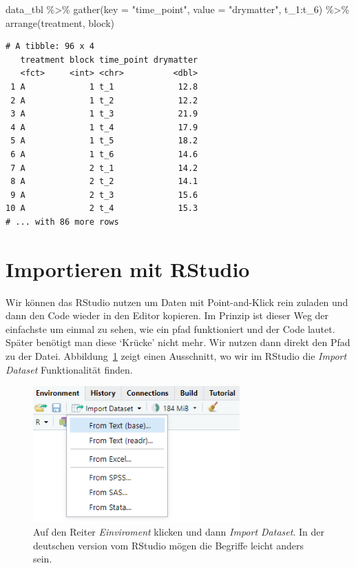 \documentclass[
  letterpaper,
  DIV=11,
  oneside]{scrreport}
\newenvironment{Shaded}{\begin{snugshade}}{\end{snugshade}}
\newcommand{\AttributeTok}[1]{\textcolor[rgb]{0.40,0.45,0.13}{#1}}
\newcommand{\FunctionTok}[1]{\textcolor[rgb]{0.28,0.35,0.67}{#1}}
\newcommand{\NormalTok}[1]{\textcolor[rgb]{0.00,0.23,0.31}{#1}}
\newcommand{\SpecialCharTok}[1]{\textcolor[rgb]{0.37,0.37,0.37}{#1}}
\newcommand{\StringTok}[1]{\textcolor[rgb]{0.13,0.47,0.30}{#1}}
\begin{document}
\begin{Shaded}
\begin{Highlighting}[]
\NormalTok{data\_tbl }\SpecialCharTok{\%\textgreater{}\%} 
  \FunctionTok{gather}\NormalTok{(}\AttributeTok{key =} \StringTok{"time\_point"}\NormalTok{, }\AttributeTok{value =} \StringTok{"drymatter"}\NormalTok{, t\_1}\SpecialCharTok{:}\NormalTok{t\_6) }\SpecialCharTok{\%\textgreater{}\%} 
  \FunctionTok{arrange}\NormalTok{(treatment, block)}
\end{Highlighting}
\end{Shaded}

\begin{verbatim}
# A tibble: 96 x 4
   treatment block time_point drymatter
   <fct>     <int> <chr>          <dbl>
 1 A             1 t_1             12.8
 2 A             1 t_2             12.2
 3 A             1 t_3             21.9
 4 A             1 t_4             17.9
 5 A             1 t_5             18.2
 6 A             1 t_6             14.6
 7 A             2 t_1             14.2
 8 A             2 t_2             14.1
 9 A             2 t_3             15.6
10 A             2 t_4             15.3
# ... with 86 more rows
\end{verbatim}

\hypertarget{importieren-mit-rstudio}{%
\section{Importieren mit RStudio}\label{importieren-mit-rstudio}}

Wir können das RStudio nutzen um Daten mit Point-and-Klick rein zuladen
und dann den Code wieder in den Editor kopieren. Im Prinzip ist dieser
Weg der einfachste um einmal zu sehen, wie ein pfad funktioniert und der
Code lautet. Später benötigt man diese `Krücke' nicht mehr. Wir nutzen
dann direkt den Pfad zu der Datei. Abbildung~\ref{fig-imp-01} zeigt
einen Ausschnitt, wo wir im RStudio die \emph{Import Dataset}
Funktionalität finden.

\begin{figure}

{\centering \includegraphics[width=3.125in,height=\textheight]{./images/import_01.PNG}

}

\caption{\label{fig-imp-01}Auf den Reiter \emph{Einviroment} klicken und
dann \emph{Import Dataset}. In der deutschen version vom RStudio mögen
die Begriffe leicht anders sein.}

\end{figure}
\end{document}
